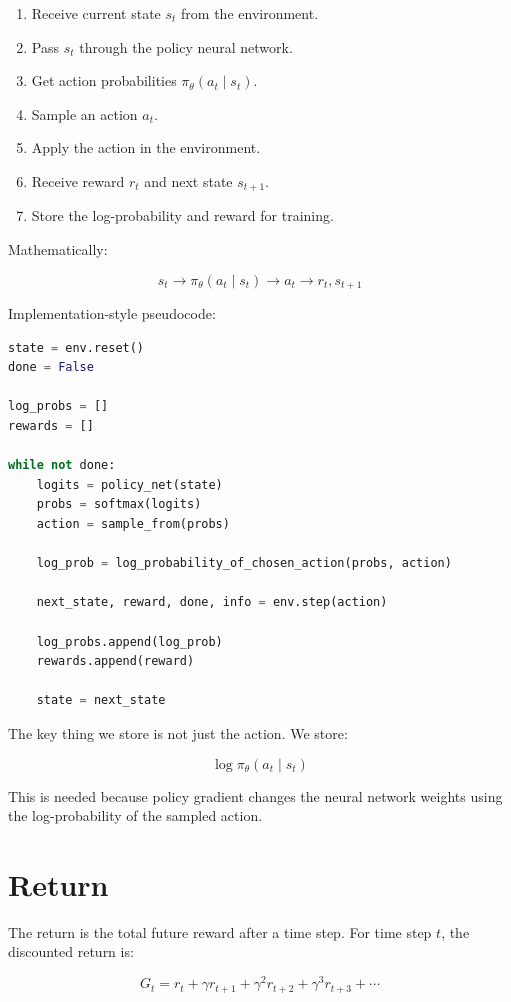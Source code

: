 \documentclass[11pt]{article}
\begin{document}
\begin{enumerate}[leftmargin=2em]
    \item Receive current state $s_t$ from the environment.
    \item Pass $s_t$ through the policy neural network.
    \item Get action probabilities $\pi_\theta(a_t \mid s_t)$.
    \item Sample an action $a_t$.
    \item Apply the action in the environment.
    \item Receive reward $r_t$ and next state $s_{t+1}$.
    \item Store the log-probability and reward for training.
\end{enumerate}

Mathematically:

\[
 s_t \rightarrow \pi_\theta(a_t \mid s_t) \rightarrow a_t \rightarrow r_t, s_{t+1}
\]

Implementation-style pseudocode:

\begin{lstlisting}[language=Python]
state = env.reset()
done = False

log_probs = []
rewards = []

while not done:
    logits = policy_net(state)
    probs = softmax(logits)
    action = sample_from(probs)

    log_prob = log_probability_of_chosen_action(probs, action)

    next_state, reward, done, info = env.step(action)

    log_probs.append(log_prob)
    rewards.append(reward)

    state = next_state
\end{lstlisting}

The key thing we store is not just the action.
We store:

\[
\log \pi_\theta(a_t \mid s_t)
\]

This is needed because policy gradient changes the neural network weights using the log-probability of the sampled action.

\section{Return}

The return is the total future reward after a time step.
For time step $t$, the discounted return is:

\[
G_t = r_t + \gamma r_{t+1} + \gamma^2 r_{t+2} + \gamma^3 r_{t+3} + \cdots
\]
\end{document}
